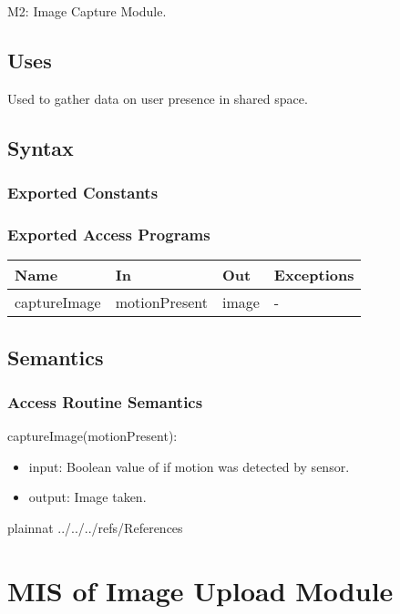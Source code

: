 \documentclass[12pt, titlepage]{article}
\begin{document}
M2: Image Capture Module.

\subsection{Uses}
Used to gather data on user presence in shared space.

\subsection{Syntax}

\subsubsection{Exported Constants}

\subsubsection{Exported Access Programs}

\begin{center}
\begin{tabular}{p{4cm} p{4cm} p{4cm} p{2cm}}
\hline
\textbf{Name} & \textbf{In} & \textbf{Out} & \textbf{Exceptions} \\
\hline
captureImage & motionPresent & image & - \\
\hline
\end{tabular}
\end{center}

\subsection{Semantics}

\subsubsection{Access Routine Semantics}

\noindent captureImage(motionPresent):
\begin{itemize}
\item input: Boolean value of if motion was detected by sensor. 
\item output: Image taken.
\end{itemize}


\newpage

 {plainnat}
 {../../../refs/References}


\newpage

\section{MIS of Image Upload Module} \label{Module} 
\end{document}
